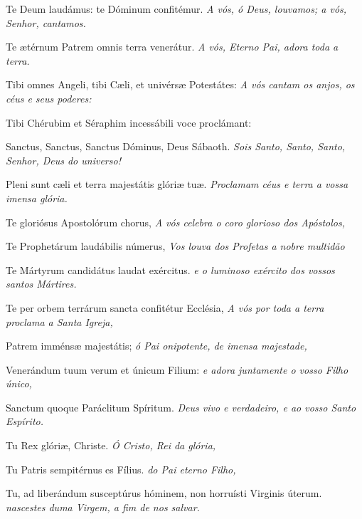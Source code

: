 
\begin{paracol}{2}
  Te Deum laudámus: te Dómi\-num confitémur.
  \switchcolumn
  \emph{A vós, ó Deus, louvamos; a vós, Senhor, cantamos.}
  \switchcolumn*

  Te ætérnum Patrem omnis terra venerátur.
  \switchcolumn
  \emph{A vós, Eterno Pai, adora toda a terra.}
  \switchcolumn*

  Tibi omnes Angeli, tibi Cæli, et univérsæ Potestátes:
  \switchcolumn
  \emph{A vós cantam os anjos, os céus e seus poderes:}
  \switchcolumn*

  Tibi Chérubim et Séraphim incessábili voce proclámant:
  \switchcolumn
  \switchcolumn*

  Sanctus, Sanctus, Sanctus Dóminus, De\-us Sábaoth.
  \switchcolumn
  \emph{Sois Santo, Santo, Santo, Senhor, Deus do universo!}
  \switchcolumn*

  Pleni sunt cæli et terra majestátis glóriæ tuæ.
  \switchcolumn
  \emph{Proclamam céus e terra a vossa i\-mensa glória.}
  \switchcolumn*

  Te gloriósus Apostolórum chorus,
  \switchcolumn
  \emph{A vós celebra o coro glorioso dos A\-póstolos,}
  \switchcolumn*

  Te Prophetárum laudábilis númerus,
  \switchcolumn
  \emph{Vos louva dos Profetas a nobre multidão}
  \switchcolumn*

  Te Mártyrum candidátus laudat exércitus.
  \switchcolumn
  \emph{e o luminoso exército dos vossos santos Mártires.}
  \switchcolumn*

  Te per orbem terrárum sancta confitétur Ecclésia,
  \switchcolumn
  \emph{A vós por toda a terra proclama a Santa Igreja,}
  \switchcolumn*

  Patrem imménsæ majestátis;
  \switchcolumn
  \emph{ó Pai onipotente, de imensa majestade,}
  \switchcolumn*

  Venerándum tuum verum et únicum Filium:
  \switchcolumn
  \emph{e adora juntamente o vosso Filho único,}
  \switchcolumn*

  Sanctum quoque Paráclitum Spíritum.
  \switchcolumn
  \emph{Deus vivo e verdadeiro, e ao vosso Santo Espírito.}
  \switchcolumn*

  Tu Rex glóriæ, Christe.
  \switchcolumn
  \emph{Ó Cristo, Rei da glória,}
  \switchcolumn*

  Tu Patris sempitérnus es Fílius.
  \switchcolumn
  \emph{do Pai eterno Filho,}
  \switchcolumn*

  Tu, ad liberándum susceptúrus hóminem,
  non horruísti Virginis úterum.
  \switchcolumn
  \emph{nascestes duma Virgem, a fim de nos salvar.}
  \switchcolumn*


\end{paracol}
